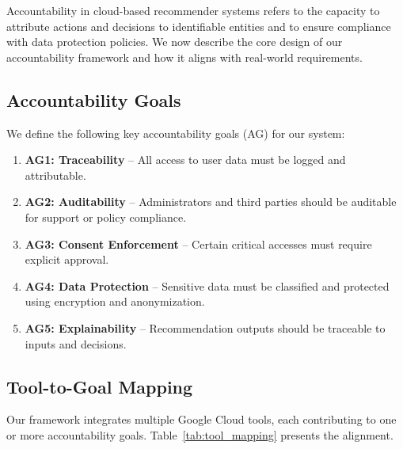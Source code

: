 \documentclass[acmsmall]{acmart}
\begin{document}
Accountability in cloud-based recommender systems refers to the capacity to attribute actions and decisions to identifiable entities and to ensure compliance with data protection policies. We now describe the core design of our accountability framework and how it aligns with real-world requirements.

\subsection{Accountability Goals}

We define the following key accountability goals (AG) for our system:

\begin{enumerate}
    \item \textbf{AG1: Traceability} – All access to user data must be logged and attributable.
    \item \textbf{AG2: Auditability} – Administrators and third parties should be auditable for support or policy compliance.
    \item \textbf{AG3: Consent Enforcement} – Certain critical accesses must require explicit approval.
    \item \textbf{AG4: Data Protection} – Sensitive data must be classified and protected using encryption and anonymization.
    \item \textbf{AG5: Explainability} – Recommendation outputs should be traceable to inputs and decisions.
\end{enumerate}

\subsection{Tool-to-Goal Mapping}

Our framework integrates multiple Google Cloud tools, each contributing to one or more accountability goals. Table~\ref{tab:tool_mapping} presents the alignment.
\end{document}
